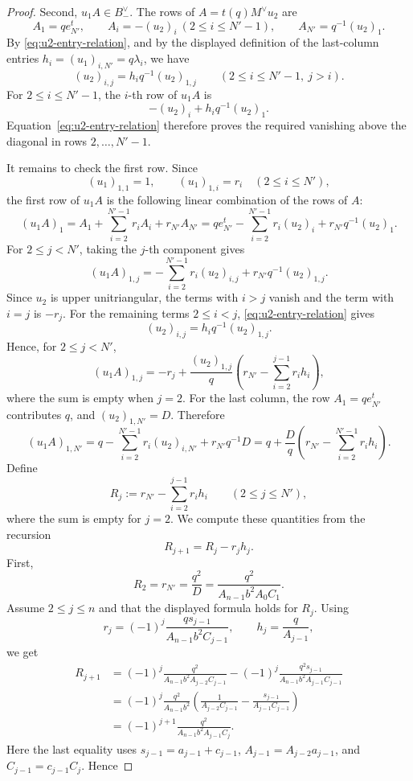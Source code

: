 \begin{proof}
Second, \(u_1A\in B_-^\vee\). The rows of \(A=t(q)M^\vee u_2\) are
\[
A_1=qe_{N'}^t,\qquad A_i=-(u_2)_i\ (2\le i\le N'-1),\qquad A_{N'}=q^{-1}(u_2)_1.
\]
By \eqref{eq:u2-entry-relation}, and by the displayed definition of the last-column entries \(h_i=(u_1)_{i,N'}=q\lambda_i\), we have
\[
(u_2)_{i,j}=h_iq^{-1}(u_2)_{1,j}
\qquad(2\le i\le N'-1,\ j>i).
\]
For \(2\le i\le N'-1\), the \(i\)-th row of \(u_1A\) is
\[
-(u_2)_i+h_iq^{-1}(u_2)_1.
\]
Equation~\eqref{eq:u2-entry-relation} therefore proves the required vanishing above the diagonal in rows \(2,\ldots,N'-1\).

It remains to check the first row. Since
\[
(u_1)_{1,1}=1,\qquad (u_1)_{1,i}=r_i\quad(2\le i\le N'),
\]
the first row of \(u_1A\) is the following linear combination of the rows of \(A\):
\[
(u_1A)_1
=
A_1+\sum_{i=2}^{N'-1}r_iA_i+r_{N'}A_{N'}
=
qe_{N'}^t-\sum_{i=2}^{N'-1}r_i(u_2)_i
+r_{N'}q^{-1}(u_2)_1.
\]
For \(2\le j<N'\), taking the \(j\)-th component gives
\[
(u_1A)_{1,j}
=
-\sum_{i=2}^{N'-1}r_i(u_2)_{i,j}
+r_{N'}q^{-1}(u_2)_{1,j}.
\]
Since \(u_2\) is upper unitriangular, the terms with \(i>j\) vanish and the term with \(i=j\) is \(-r_j\). For the remaining terms \(2\le i<j\), \eqref{eq:u2-entry-relation} gives
\[
(u_2)_{i,j}=h_iq^{-1}(u_2)_{1,j}.
\]
Hence, for \(2\le j<N'\),
\[
(u_1A)_{1,j}
=
-r_j+\frac{(u_2)_{1,j}}{q}
\left(
r_{N'}-\sum_{i=2}^{j-1}r_ih_i
\right),
\]
where the sum is empty when \(j=2\). For the last column, the row \(A_1=qe_{N'}^t\) contributes \(q\), and \((u_2)_{1,N'}=D\). Therefore
\[
(u_1A)_{1,N'}
=
q-\sum_{i=2}^{N'-1}r_i(u_2)_{i,N'}
+r_{N'}q^{-1}D
=
q+\frac{D}{q}
\left(
r_{N'}-\sum_{i=2}^{N'-1}r_ih_i
\right).
\]
Define
\[
R_j:=r_{N'}-\sum_{i=2}^{j-1}r_ih_i
\qquad(2\le j\le N'),
\]
where the sum is empty for \(j=2\). We compute these quantities from the recursion
\[
R_{j+1}=R_j-r_jh_j.
\]
First,
\[
R_2=r_{N'}=\frac{q^2}{D}
=\frac{q^2}{A_{n-1}b^2A_0C_1}.
\]
Assume \(2\le j\le n\) and that the displayed formula holds for \(R_j\). Using
\[
r_j=(-1)^j\frac{q s_{j-1}}{A_{n-1}b^2C_{j-1}},
\qquad
h_j=\frac{q}{A_{j-1}},
\]
we get
\[
\begin{aligned}
R_{j+1}
&=
(-1)^j\frac{q^2}{A_{n-1}b^2A_{j-2}C_{j-1}}
-
(-1)^j\frac{q^2s_{j-1}}{A_{n-1}b^2A_{j-1}C_{j-1}}\\
&=
(-1)^j\frac{q^2}{A_{n-1}b^2}
\left(
\frac{1}{A_{j-2}C_{j-1}}
-
\frac{s_{j-1}}{A_{j-1}C_{j-1}}
\right)\\
&=
(-1)^{j+1}
\frac{q^2}{A_{n-1}b^2A_{j-1}C_j}.
\end{aligned}
\]
Here the last equality uses \(s_{j-1}=a_{j-1}+c_{j-1}\), \(A_{j-1}=A_{j-2}a_{j-1}\), and \(C_{j-1}=c_{j-1}C_j\). Hence

\end{proof}
